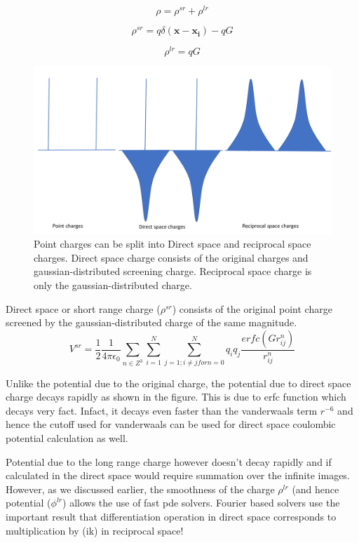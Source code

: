 \documentclass[9pt,bestpractices]{livecoms}
\begin{document}
\[ \rho = \rho^{sr} + \rho^{lr} \]

\[ \rho^{sr} = q\delta(\boldsymbol{x}-\boldsymbol{x_i}) - qG\] 

\[ \rho^{lr} = qG \]      


\begin{figure}[h]
\centering
\includegraphics[width=\linewidth]{charges_ewald.pdf}
    \caption{Point charges can be split into Direct space and reciprocal space charges. Direct space charge consists of the original charges and gaussian-distributed screening charge. Reciprocal space charge is only the gaussian-distributed charge.}
\label{charges_ewald}
\end{figure}

Direct space or short range charge ($\rho^{sr}$) consists of the original point charge screened by the gaussian-distributed charge of the same magnitude. 
\[
V^{sr} = \frac{1}{2} \frac{1}{4 \pi \epsilon_0} \sum_{n \in Z^3} \sum_{i=1}^{N}\sum_{j=1; i\neq j for n = 0}^{N} q_i q_j \frac{erfc(Gr_{ij}^{n})}{r_{ij}^{n}}
\]

Unlike the potential due to the original charge, the potential due to direct space charge decays rapidly as shown in the figure. This is due to erfc function which decays very fact. Infact, it decays even faster than the vanderwaals term $r^{-6}$ and hence the cutoff used for vanderwaals can be used for direct space coulombic potential calculation as well. 

Potential due to the long range charge however doesn't decay rapidly and if calculated in the direct space would require summation over the infinite images. However, as we discussed earlier, the smoothness of the  charge $\rho^{lr}$ (and hence potential ($\phi^{lr}$) allows the use of fast pde solvers. Fourier based solvers use the important result that differentiation operation in direct space corresponds to multiplication by (ik) in reciprocal space! 
\end{document}
